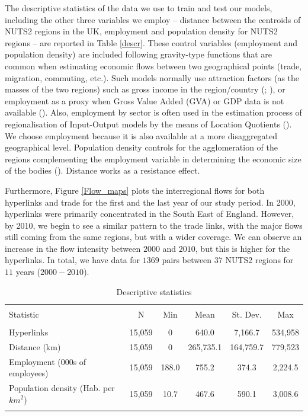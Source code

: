 \documentclass[]{interact}
\theoremstyle{plain}%
\theoremstyle{definition}
\theoremstyle{remark}
\begin{document}
The descriptive statistics of the data we use to train and test our
models, including the other three variables we employ -- distance
between the centroids of NUTS2 regions in the UK, employment and
population density for NUTS2 regions -- are reported in Table
\ref{descr}. These control variables (employment and population density)
are included following gravity-type functions that are common when
estimating economic flows between two geographical points (trade,
migration, commuting, etc.). Such models normally use attraction factors
(as the masses of the two regions) such as gross income in the
region/country (\citet{anderson2003gravity};
\citet{riddington2006comparison}), or employment as a proxy when Gross
Value Added (GVA) or GDP data is not available
(\citet{kimura2006gravity}). Also, employment by sector is often used in
the estimation process of regionalisation of Input-Output models by the
means of Location Quotients (\citet{flegg2000regional}). We choose
employment because it is also available at a more disaggregated
geographical level. Population density controls for the agglomeration of
the regions complementing the employment variable in determining the
economic size of the bodies (\citet{greene2013export}). Distance works
as a resistance effect.

Furthermore, Figure \ref{Flow_maps} plots the interregional flows for
both hyperlinks and trade for the first and the last year of our study
period. In 2000, hyperlinks were primarily concentrated in the South
East of England. However, by 2010, we begin to see a similar pattern to
the trade links, with the major flows still coming from the same
regions, but with a wider coverage. We can observe an increase in the
flow intensity between \(2000\) and \(2010\), but this is higher for the
hyperlinks. In total, we have data for \(1369\) pairs between \(37\)
NUTS2 regions for \(11\) years (\(2000-2010\)).

\begin{table}[!htbp] \centering 
  \caption{Descriptive statistics\label{descr}} 
  \label{} 
\footnotesize 
\begin{tabular}{@{\extracolsep{1pt}}lccccc} 
\\[-1.8ex]\hline 
\hline \\[-1.8ex] 
Statistic & \multicolumn{1}{c}{N} & \multicolumn{1}{c}{Min} & \multicolumn{1}{c}{Mean} & \multicolumn{1}{c}{St. Dev.} & \multicolumn{1}{c}{Max} \\ 
\hline \\[-1.8ex] 
Hyperlinks & 15,059 & 0 & 640.0 & 7,166.7 & 534,958 \\ 
Distance (km) & 15,059 & 0 & 265,735.1 & 164,759.7 & 779,523 \\ 
Employment (000s of employees) & 15,059 & 188.0 & 755.2 & 374.3 & 2,224.5 \\ 
Population density (Hab. per $km^2$) & 15,059 & 10.7 & 467.6 & 590.1 & 3,008.6 \\ 
\hline \\[-1.8ex] 
\end{tabular} 
\end{table}
\end{document}
